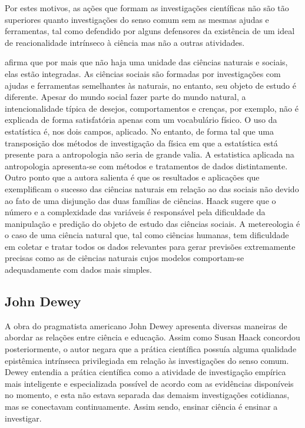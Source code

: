\documentclass[12pt]{report}
\begin{document}
		Por estes motivos, as ações que formam as investigações científicas não são tão superiores quanto investigações do senso comum sem as mesmas ajudas e ferramentas, tal como defendido por alguns defensores da existência de um ideal de reacionalidade intrínseco à ciência mas não a outras atividades.

		\textcite{haack-defending-science} afirma que por mais que não haja uma unidade das ciências naturais e sociais, elas estão integradas. As ciências sociais são formadas por investigações com ajudas e ferramentas semelhantes às naturais, no entanto, seu objeto de estudo é diferente. Apesar do mundo social fazer parte do mundo natural, a intencionalidade típica de desejos, comportamentos e crenças, por exemplo, não é explicada de forma satisfatória apenas com um vocabulário físico. O uso da estatística é, nos dois campos, aplicado. No entanto, de forma tal que uma transposição dos métodos de investigação da física em que a estatística está presente para a antropologia não seria de grande valia. A estatistica aplicada na antropologia apresenta-se com métodos e tratamentos de dados distintamente. Outro ponto que a autora salienta é que os resultados e aplicações que exemplificam o sucesso das ciências naturais em relação ao das sociais não devido ao fato de uma disjunção das duas famílias de ciências. Haack sugere que o número e a complexidade das variáveis é responsável pela dificuldade da manipulação e predição do objeto de estudo das ciências sociais. A metereologia é o caso de uma ciência natural que, tal como ciências humanas, tem dificuldade em coletar e tratar todos os dados relevantes para gerar previsões extremamente precisas como as de ciências naturais cujos modelos comportam-se adequadamente com dados mais simples.
	
	\subsection{John Dewey}
	
		A obra do pragmatista americano John Dewey apresenta diversas maneiras de abordar as relações entre ciência e educação. Assim como Susan Haack concordou posteriormente, o autor negara que a prática científica possuía alguma qualidade epistêmica intrínseca privilegiada em relação às investigações do senso comum. Dewey entendia a prática científica como a atividade de investigação empírica mais inteligente e especializada possível de acordo com as evidências disponíveis no momento, e esta não estava separada das demaism investigações cotidianas, mas se conectavam continuamente. Assim sendo, ensinar ciência é ensinar a investigar.
		
\end{document}

